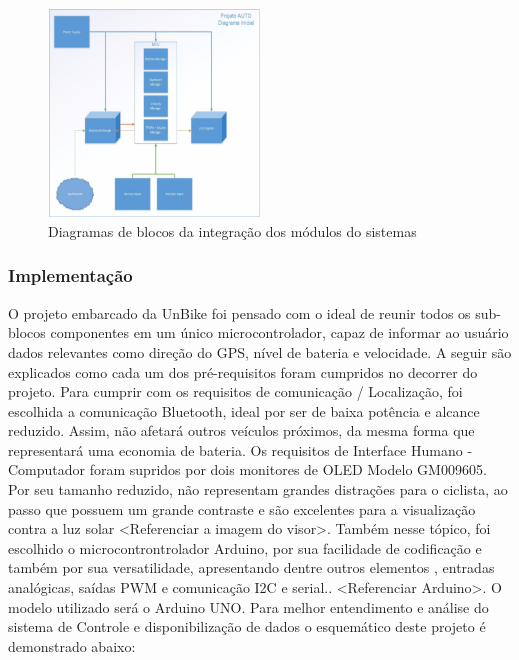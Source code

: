  			\graphicspath{{figuras/}}
 			\begin{figure}[h!]
 				\centering
 				\includegraphics[width=0.5\textwidth]{Figura6_Diagrama_de_modulos_do_sistema.PNG}
 				\caption{Diagramas de blocos da integração dos módulos do sistemas}
 				\label{img:Diagrama_de_modulos_do_sistema}
 			\end{figure}
 		 		
		\subsubsection{Implementação}
		O projeto embarcado da UnBike foi pensado com o ideal de reunir todos os sub-blocos componentes em um único microcontrolador, capaz de informar ao usuário dados relevantes como direção do GPS, nível de bateria e velocidade. A seguir são explicados como cada um dos pré-requisitos foram cumpridos no decorrer do projeto.
		Para cumprir com os requisitos de  comunicação / Localização, foi escolhida a comunicação Bluetooth, ideal por ser de baixa potência e alcance reduzido. Assim, não afetará outros veículos próximos, da mesma forma que representará uma economia de bateria. 
		Os requisitos de Interface Humano - Computador foram supridos por dois monitores de OLED Modelo GM009605. Por seu tamanho reduzido, não representam grandes distrações para o ciclista, ao passo que possuem um grande contraste e são excelentes para a visualização contra a luz solar <Referenciar a imagem do visor>. Também nesse tópico, foi escolhido o microcontrontrolador Arduino, por sua facilidade de codificação e também por sua versatilidade, apresentando dentre outros elementos , entradas analógicas, saídas PWM e comunicação I2C e serial.. <Referenciar Arduino>. O modelo utilizado será o Arduino UNO.
		Para melhor entendimento e análise do sistema de Controle e disponibilização de dados o esquemático deste projeto é demonstrado abaixo:
		\newpage
		
